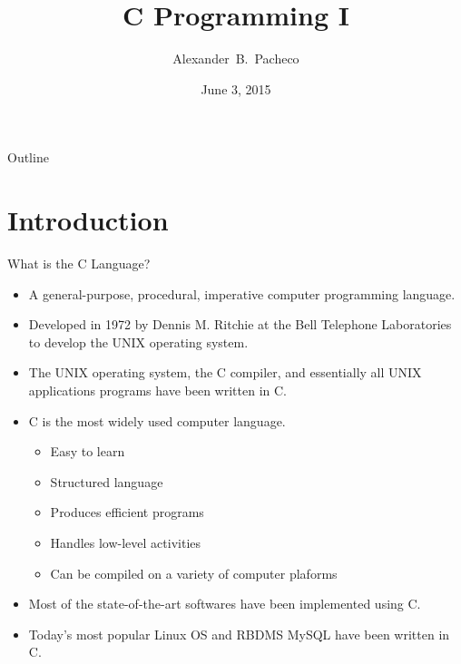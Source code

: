 \documentclass[10pt,t]{beamer}
\title{C Programming I}
\author[Alex Pacheco]{\large{Alexander~B.~Pacheco}}
\institute{\href{http://researchcomputing.lehigh.edu}{LTS Research Computing}}
\date{June 3, 2015}
\begin{document}
\frame{\titlepage}

\begin{frame}{Outline}
  \tableofcontents
\end{frame}

\section{Introduction}
\begin{frame}{What is the C Language?}
  \begin{itemize}
    \item A general-purpose, procedural, imperative computer programming language.
    \item Developed in 1972 by Dennis M. Ritchie at the Bell Telephone Laboratories to develop the UNIX operating system.
    \item The UNIX operating system, the C compiler, and essentially all UNIX applications programs have been written in C.
    \item C is the most widely used computer language.
    \begin{itemize}
      \item Easy to learn
      \item Structured language
      \item Produces efficient programs
      \item Handles low-level activities
      \item Can be compiled on a variety of computer plaforms
    \end{itemize}
    \item Most of the state-of-the-art softwares have been implemented using C.
    \item Today's most popular Linux OS and RBDMS MySQL have been written in C.
  \end{itemize}
\end{frame}
\end{document}
